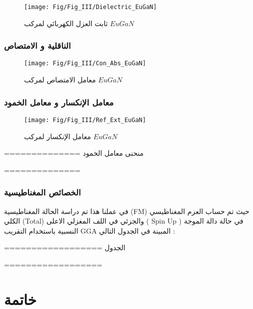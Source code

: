 \begin{figure}[h!]
	\centering
	\texttt{[image: Fig/Fig\_III/Dielectric\_EuGaN]}
	\caption{ثابت العزل الكهربائي لمركب $  EuGaN $}
	\label{fig:dielectriceugan}
\end{figure}
\FloatBarrier

\subsection*{الناقلية و الامتصاص}

\begin{figure}[h!]
	\centering
	\texttt{[image: Fig/Fig\_III/Con\_Abs\_EuGaN]}
	\caption{ معامل الامتصاص لمركب $  EuGaN $ }
	\label{fig:conabseugan}
\end{figure}
\FloatBarrier

\subsection*{معامل الإنكسار و معامل الخمود}
\begin{figure}[h!]
	\centering
	\texttt{[image: Fig/Fig\_III/Ref\_Ext\_EuGaN]}
	\caption{ معامل الإنكسار لمركب $  EuGaN $  }
	\label{fig:refexteugan}
\end{figure}
\FloatBarrier

==============
منحنى معامل الخمود

==============

\subsection{الخصائص المغناطيسية}
في عملنا هذا تم دراسة الحالة المغناطيسية (FM) حيث تم حساب العزم المغناطيسي الكلي (Total) والجزئي في اللف المغزلي الاعلى ( Spin Up ) في حالة دالة الموجة النسبية باستخدام التقريب GGA المبينة في الجدول التالي :

==================
الجدول

==================


\chapter*{  خاتمة }